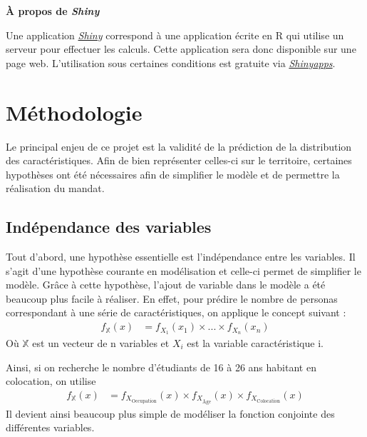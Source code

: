 \documentclass[11pt,french]{article}\usepackage[]{graphicx}\usepackage[]{color}
\newenvironment{moreInfo}[1]
	{\begin{mdframed}
	\textcolor{NavyBlue}{\huge \raisebox{-3.5pt}{\faInfo} 
	\hspace{0.5cm} \large\bfseries #1}\\[5pt]
	\normalsize
	\makebox[0.1\textwidth][l]{}	
	\begin{minipage}{10cm}}
	{	\end{minipage}
	\end{mdframed}}
\begin{document}
\begin{moreInfo}{\color{NavyBlue}À propos de \emph{Shiny}
     \color{black}}
     Une application \href{https://shiny.rstudio.com}{\emph{Shiny}} correspond à une application écrite en R qui utilise un serveur pour effectuer les calculs. Cette application sera donc disponible sur une page web. L'utilisation sous certaines conditions est gratuite via  \href{https://www.shinyapps.io}{\emph{Shinyapps}}.
\end{moreInfo}

\section{Méthodologie}

Le principal enjeu de ce projet est la validité de la prédiction de la distribution des caractéristiques. Afin de bien représenter celles-ci sur le territoire, certaines hypothèses ont été nécessaires afin de simplifier le modèle et de permettre la réalisation du mandat.
\newline

\subsection{Indépendance des variables}

Tout d'abord, une hypothèse essentielle est l'indépendance entre les variables. Il s'agit d'une hypothèse courante en modélisation et celle-ci permet de simplifier le modèle. Grâce à cette hypothèse, l'ajout de variable dans le modèle a été beaucoup plus facile à réaliser. En effet, pour prédire le nombre de personas correspondant à une série de caractéristiques, on applique le concept suivant :
\begin{align*}
f_{\mathbb{X}}(x) &= f_{X_1}(x_1) \times ... \times f_{X_n}(x_n)
\end{align*}
Où $\mathbb{X}$ est un vecteur de n variables et $X_i$ est la variable caractéristique i.
\newline

Ainsi, si on recherche le nombre d'étudiants de 16 à 26 ans habitant en colocation, on utilise 
\begin{align*}
f_{\mathbb{X}}(x) &= f_{X_{\text{Occupation}}}(x) \times f_{X_{\text{Âge}}}(x) \times f_{X_{\text{Colocation}}}(x)
\end{align*}
Il devient ainsi beaucoup plus simple de modéliser la fonction conjointe des différentes variables. 
\newline
\end{document}
